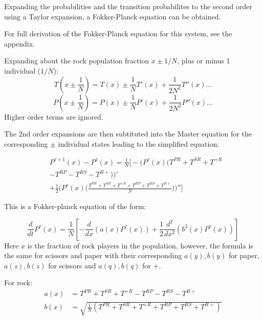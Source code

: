 \documentclass[%
 reprint,
 amsmath,amssymb,
 aps,
]{revtex4-2}
\begin{document}
Expanding the probabilities and the transition probabilites to the 
second order using a Taylor expansion, a Fokker-Planck equation 
can be obtained.

For full derivation of the Fokker-Planck equation for this system,
see the appendix.


Expanding about the rock population fraction $x \pm 1/N$, 
plus or minus 1 individual ($1/N$):
\begin{equation}
  T(x\pm\frac{1}{N}) = T(x) \pm \frac{1}{N}T'(x) + \frac{1}{2N^2}T''(x)\dots \nonumber
\end{equation}
\begin{equation}
  P(x\pm\frac{1}{N}) = P(x) \pm \frac{1}{N}P'(x) + \frac{1}{2N^2}P''(x)\dots \nonumber
\end{equation}
Higher order terms are ignored.

The 2nd order expansions are then subtituted into the Master equation
for the corresponding $\pm$ individual states leading to the 
simplified equation:

\begin{align}
&P^{\tau+1}(x)-P^\tau(x) = \frac{1}{N}\Big[
    -\big(P^\tau(x)\big(
          T^{PR} + T^{SR} + T^{+R} \nonumber \\
        &- T^{RP} - T^{RS} - T^{R+}
      \big)\big)'
\nonumber \\[6pt]
 &+ \frac{1}{2}\big(
      P^\tau(x)\big(\frac{T^{PR}+T^{SR}+T^{+R}
       + T^{RP} +T^{RS}+T^{R+}}{N}\big)
    \big)'' \Big]
\end{align}


This is a Fokker-planck equation of the form:

\begin{equation}
\frac{d}{dt}P^\tau(x)
=
\frac{1}{N}
\left[
-\frac{d}{dx}\!\left(a(x)P^\tau(x)\right)
+ \frac{1}{2}\frac{d^2}{dx^2}\!\left(b^2(x)P^\tau(x)\right)
\right]
\end{equation}
Here $x$ is the fraction of rock players in the population, however, 
the formula is the same for scissors and paper with 
their corresponding $a(y), b(y)$ for paper,
$a(z), b(z)$ for scissors and $a(q), b(q)$ for $+$.

For rock:
\begin{equation} \nonumber
\begin{aligned}
a(x) &= T^{PR} + T^{SR} + T^{+R}
       - T^{RP} - T^{RS} - T^{R+} \\
b(x) &= \sqrt{\frac{1}{N}
\left(
T^{PR} + T^{SR} + T^{+R}
+ T^{RP} + T^{RS} + T^{R+}
\right)}
\end{aligned}
\end{equation}
\end{document}
